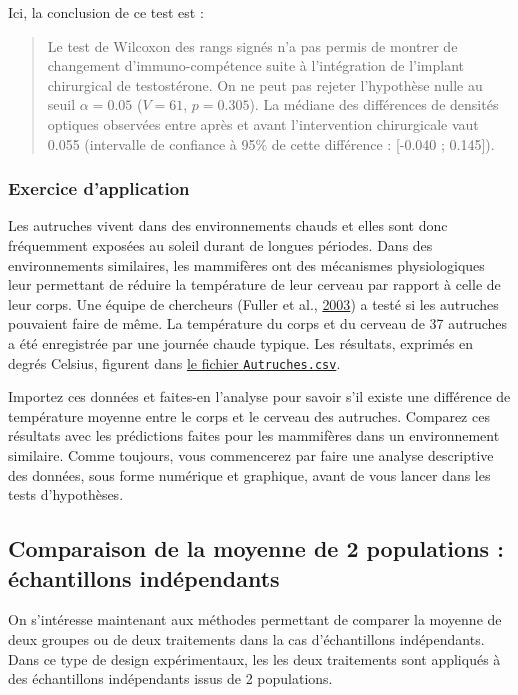 \documentclass[a4paperpaper,]{article}
\begin{document}
Ici, la conclusion de ce test est :

\begin{quote}
Le test de Wilcoxon des rangs signés n'a pas permis de montrer de changement d'immuno-compétence suite à l'intégration de l'implant chirurgical de testostérone. On ne peut pas rejeter l'hypothèse nulle au seuil \(\alpha = 0.05\) (\(V = 61\), \(p = 0.305\)). La médiane des différences de densités optiques observées entre après et avant l'intervention chirurgicale vaut 0.055 (intervalle de confiance à 95\% de cette différence : {[}-0.040 ; 0.145{]}).
\end{quote}

\hypertarget{exercice-dapplication-1}{%
\subsubsection{Exercice d'application}\label{exercice-dapplication-1}}

Les autruches vivent dans des environnements chauds et elles sont donc fréquemment exposées au soleil durant de longues périodes. Dans des environnements similaires, les mammifères ont des mécanismes physiologiques leur permettant de réduire la température de leur cerveau par rapport à celle de leur corps. Une équipe de chercheurs (Fuller et al., \protect\hyperlink{ref-Fuller2003}{2003}) a testé si les autruches pouvaient faire de même. La température du corps et du cerveau de 37 autruches a été enregistrée par une journée chaude typique. Les résultats, exprimés en degrés Celsius, figurent dans \href{https://besibo.github.io/Biometrie3/data/Autruches.csv}{le fichier \texttt{Autruches.csv}}.

Importez ces données et faites-en l'analyse pour savoir s'il existe une différence de température moyenne entre le corps et le cerveau des autruches. Comparez ces résultats avec les prédictions faites pour les mammifères dans un environnement similaire. Comme toujours, vous commencerez par faire une analyse descriptive des données, sous forme numérique et graphique, avant de vous lancer dans les tests d'hypothèses.

\hypertarget{Indep}{%
\subsection{Comparaison de la moyenne de 2 populations : échantillons indépendants}\label{Indep}}

On s'intéresse maintenant aux méthodes permettant de comparer la moyenne de deux groupes ou de deux traitements dans la cas d'échantillons indépendants. Dans ce type de design expérimentaux, les les deux traitements sont appliqués à des échantillons indépendants issus de 2 populations.
\end{document}
